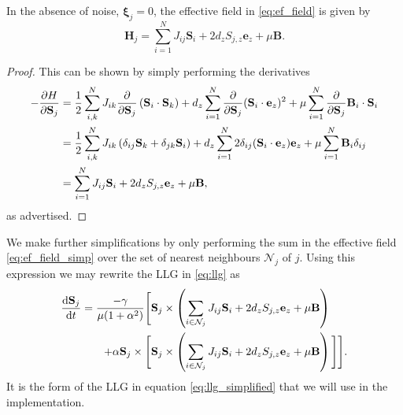 \begin{prop}
	In the absence of noise, $\boldsymbol{\xi}_j = 0$, the effective field in \eqref{eq:ef_field} is given by
	\begin{equation}\label{eq:ef_field_simp}
		\mathbf{H}_j = \sum_{i=1}^{N} J_{ij} \mathbf{S}_i + 2d_z S_{j,z} \mathbf{e}_z + \mu \mathbf{B}.
	\end{equation}
\end{prop}
\begin{proof}
This can be shown by simply performing the derivatives 
\begin{align*}
	-\frac{\partial H}{\partial \mathbf{S}_j} &= \frac{1}{2}\sum_{i,k}^{N} J_{ik} \frac{\partial}{\partial \mathbf{S}_j} \left( \mathbf{S}_i \cdot \mathbf{S}_k \right) + d_z \sum_{i=1}^{N} \frac{\partial }{\partial \mathbf{S}_j}(\mathbf{S}_i \cdot \mathbf{e}_z)^2 + \mu \sum_{i=1}^{N} \frac{\partial }{\partial \mathbf{S}_j} \mathbf{B}_i \cdot \mathbf{S}_i \\
	&= \frac{1}{2}\sum_{i,k}^{N} J_{ik} \left( \delta_{ij} \mathbf{S}_k + \delta_{jk} \mathbf{S}_i \right) + d_z \sum_{i=1}^N 2 \delta_{ij} (\mathbf{S}_i \cdot \mathbf{e}_z) \mathbf{e}_z + \mu \sum_{i=1}^N \mathbf{B}_i \delta_{ij} \\
	&= \sum_{i=1}^N J_{ij} \mathbf{S}_i + 2d_z S_{j,z} \mathbf{e}_z + \mu \mathbf{B},
\end{align*}
as advertised.
\end{proof}
We make further simplifications by only performing the sum in the effective field \eqref{eq:ef_field_simp} over the set of nearest neighbours $\mathcal{N}_j$ of $j$.
Using this expression we may rewrite the LLG in \eqref{eq:llg} as
\begin{align}\label{eq:llg_simplified}
	\frac{\text{d} \mathbf{S}_j}{\text{d} t} = \frac{-\gamma}{\mu(1 + \alpha^2)} \Bigg[ \mathbf{S}_j &\times \left( \sum_{i \in \mathcal{N}_j} J_{ij} \mathbf{S}_i + 2d_z S_{j,z} \mathbf{e}_z + \mu \mathbf{B} \right) \nonumber \\
	+ \alpha \mathbf{S}_j \times \Bigg[  \mathbf{S}_j  &\times \left( \sum_{i \in \mathcal{N}_j} J_{ij} \mathbf{S}_i + 2d_z S_{j,z} \mathbf{e}_z + \mu \mathbf{B} \right) \Bigg] \Bigg]. 
\end{align}
It is the form of the LLG in equation \ref{eq:llg_simplified} that we will use in the implementation.